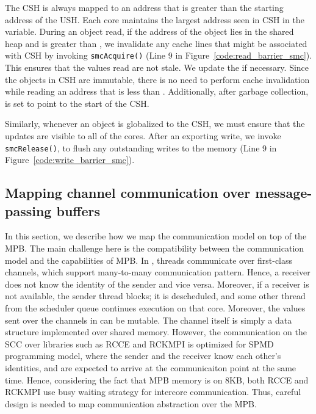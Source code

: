 The CSH is always mapped to an address that is greater than the starting
address of the USH. Each core maintains the largest address seen in CSH in the
 variable. During an object read, if the address of the
object lies in the shared heap and is greater than , we
invalidate any cache lines that might be associated with CSH by invoking
\texttt{smcAcquire()} (Line 9 in Figure~\ref{code:read_barrier_smc}). This
ensures that the values read are not stale. We update the 
if necessary. Since the objects in CSH are immutable, there is no need to
perform cache invalidation while reading an address that is less than
. Additionally, after garbage collection,
 is set to point to the start of the CSH.

Similarly, whenever an object is globalized to the CSH, we must ensure that the
updates are visible to all of the cores. After an exporting write, we invoke
\texttt{smcRelease()}, to flush any outstanding writes to the memory (Line 9 in
Figure~\ref{code:write_barrier_smc}).

\subsection{Mapping channel communication over message-passing buffers}
\label{sec:comm_opt}

In this section, we describe how we map the \MM communication model on top of
the MPB. The main challenge here is the compatibility between the \MM
communication model and the capabilities of MPB. In \MM, threads communicate
over first-class channels, which support many-to-many communication pattern.
Hence, a receiver does not know the identity of the sender and vice versa.
Moreover, if a receiver is not available, the sender thread blocks; it is
descheduled, and some other thread from the scheduler queue continues execution
on that core. Moreover, the values sent over the channels in \MM can be
mutable. The channel itself is simply a data structure implemented over shared
memory. However, the communication on the SCC over libraries such as RCCE and
RCKMPI is optimized for SPMD programming model, where the sender and the
receiver know each other's identities, and are expected to arrive at the
communicaiton point at the same time. Hence, considering the fact that MPB
memory is on 8KB, both RCCE and RCKMPI use busy waiting strategy for intercore
communication. Thus, careful design is needed to map \MM communication
abstraction over the MPB.

